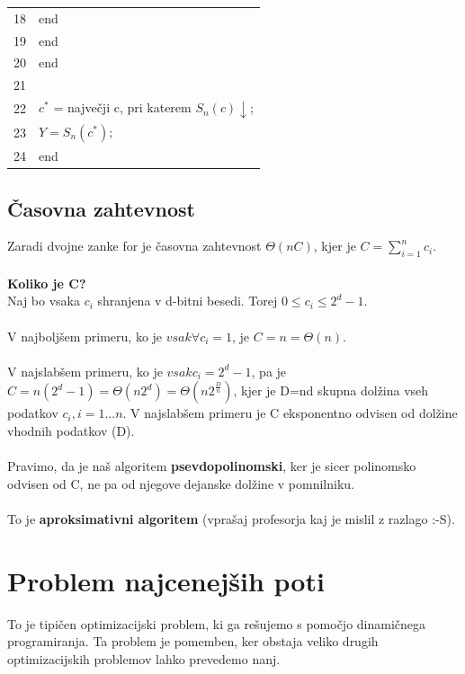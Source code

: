 \documentclass[a4paper,10pt]{article}
\begin{document}
\begin{tabular}{r|l|}
18	& 			\hspace{60pt}end\\
19	& 		\hspace{40pt}end\\
20	& 	\hspace{20pt}end\\
21	& \\
22	& 	\hspace{20pt}$c^*$ = najve\v cji c, pri katerem $S_n(c) \downarrow$;\\
23	& 	\hspace{20pt}$Y = S_n(c^*)$;\\
24	& end\\\cline{2-2}
\end{tabular}

\subsection{\v Casovna zahtevnost}

Zaradi dvojne zanke for je \v casovna zahtevnost $\Theta (n C)$, kjer je $C = \sum_{i=1}^n c_i$.\\
\\
\textbf{Koliko je C?}\\
Naj bo vsaka $c_i$ shranjena v d-bitni besedi. Torej $0 \leq c_i \leq 2^d-1$.\\
\\
V najbolj\v sem primeru, ko je $vsak\forall c_i=1$, je $C = n = \Theta(n)$.\\
\\
V najslab\v sem primeru, ko je $vsak c_i = 2^d - 1$, pa je $C = n(2^d - 1) = \Theta(n 2^d) = \Theta(n 2^{\frac{D}{n}})$, kjer je D=nd skupna dol\v zina vseh podatkov $c_i, i=1...n$. V najslab\v sem primeru je C eksponentno odvisen od dol\v zine vhodnih podatkov (D).\\
\\
Pravimo, da je na\v s algoritem \textbf{psevdopolinomski}, ker je sicer polinomsko odvisen od C, ne pa od njegove dejanske dol\v zine v pomnilniku.\\
\\
To je \textbf{aproksimativni algoritem} (vpra\v saj profesorja kaj je mislil z razlago :-S).

\section{Problem najcenej\v sih poti}

To je tipi\v cen optimizacijski problem, ki ga re\v sujemo s pomo\v cjo dinami\v cnega programiranja. Ta problem je pomemben, ker obstaja veliko drugih optimizacijskih problemov lahko prevedemo nanj.
\end{document}
